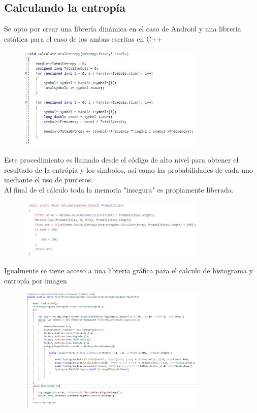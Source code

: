 \documentclass[conference]{IEEEtran}
\begin{document}
\subsection{Calculando la entropía}
Se opto por crear una librería dinámica en el caso de Android y una librería estática para el caso de ios ambas escritas en C++
\begin{figure}[h!]
    \centering
    \includegraphics[width=9cm]{codeL.jpg}
\end{figure}
Este procedimiento es llamado desde el código de alto nivel para obtener el resultado de la entrópia y los simbolos, así como las probabilidades de cada uno mediante el uso de punteros.
\\Al final de el cálculo toda la memoria "insegura" es propiamente liberada.
\begin{figure}[h!]
    \centering
    \includegraphics[width=9cm]{codeC.jpg}
\end{figure}
Igualmente se tiene acceso a una libreria gráfica para el calculo de histograma y entropía por imagen
\begin{figure}[h!]
    \centering
    \includegraphics[width=9cm]{codeC2.jpg}
\end{figure}
\end{document}
